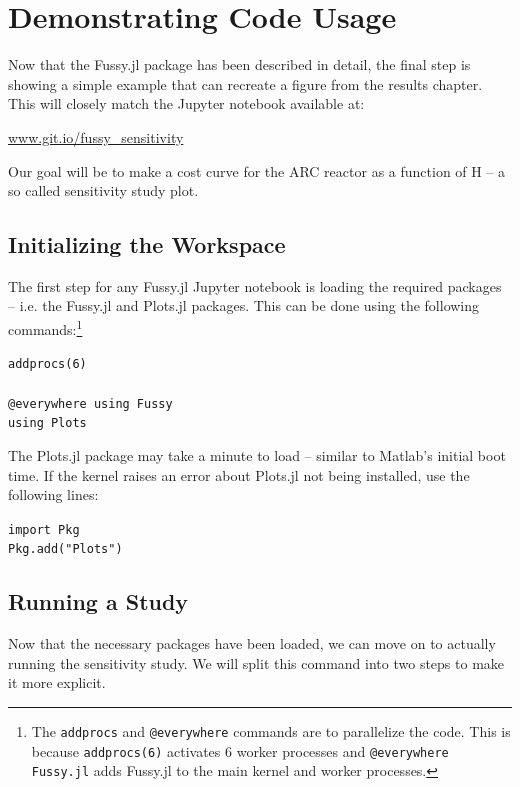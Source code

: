 \section{Demonstrating Code Usage}

Now that the Fussy.jl package has been described in detail, the final step is showing a simple example that can recreate a figure from the results chapter. This will closely match the Jupyter notebook available at:

{\centering \href{https://git.io/fussy_sensitivity}{www.git.io/fussy\_sensitivity} \par }

Our goal will be to make a cost curve for the ARC reactor as a function of H -- a so called sensitivity study plot.

\subsection{Initializing the Workspace}

The first step for any Fussy.jl Jupyter notebook is loading the required packages -- i.e. the Fussy.jl and Plots.jl packages. This can be done using the following commands:\footnote{The \texttt{addprocs} and \texttt{@everywhere} commands are to parallelize the code. This is because \texttt{addprocs(6)} activates 6 worker processes and \texttt{@everywhere Fussy.jl} adds Fussy.jl to the main kernel and worker processes.}

\begin{addmargin}[1.5em]{1.5em}
\texttt{addprocs(6) \\ ~ \\
@everywhere using Fussy \\
using Plots
}
\end{addmargin}

The Plots.jl package may take a minute to load -- similar to Matlab's initial boot time. If the kernel raises an error about Plots.jl not being installed, use the following lines:

\begin{addmargin}[1.5em]{1.5em}
\texttt{import Pkg \\
Pkg.add("Plots")
}
\end{addmargin}

\subsection{Running a Study}

Now that the necessary packages have been loaded, we can move on to actually running the sensitivity study. We will split this command into two steps to make it more explicit. 

